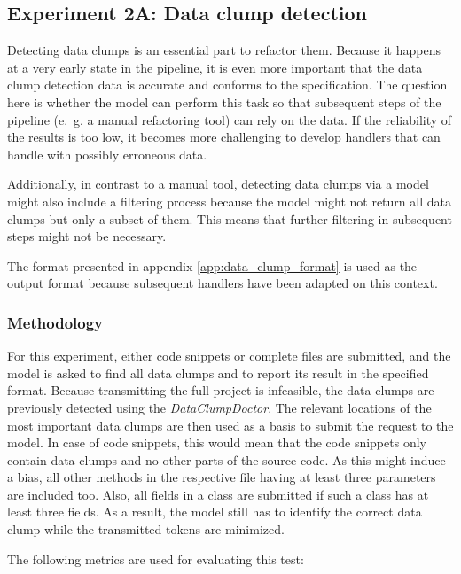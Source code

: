 \subsection{Experiment 2A: Data clump detection}

Detecting data clumps is an essential part to refactor them. Because it happens at a very early state in the pipeline, it is even more important that the data clump detection data is accurate and conforms to the specification. The question here is whether the model can perform this task so that subsequent steps of the pipeline (e.~g. a manual refactoring tool) can rely on the data. If the reliability of the results is too low, it becomes more challenging to develop  handlers that can handle with possibly erroneous data.

Additionally, in contrast to a manual tool, detecting data clumps via  a model might also include a filtering process because the model might not return all data clumps but only a subset of them. This means that further filtering in subsequent steps might not be necessary. 

The format presented in appendix \ref{app:data_clump_format} is used as the output format because subsequent handlers have been adapted on this context. 


\subsubsection{Methodology}

For this experiment, either code snippets or complete files are submitted, and the model is asked to find all data clumps and to report its result in the specified format.
Because transmitting the full project is infeasible, the data clumps are previously detected using the \textit{DataClumpDoctor}. The relevant locations of the most important data clumps are then used as a basis to submit the request to the model. In case of code snippets, this would mean that the code snippets only contain data clumps and no other parts of the source code. As this might induce a bias, all other methods in the respective file having at least three parameters are included too. Also, all fields in a class are submitted if such a class has at least three fields. As a result, the model still has to identify the correct data clump while  the transmitted tokens are minimized.  


The following metrics are used for evaluating this test:

